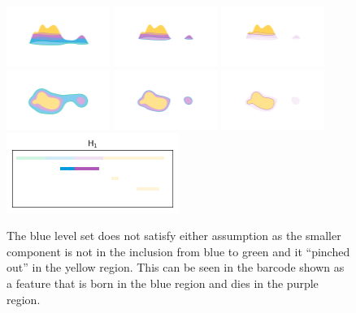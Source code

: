\begin{figure}[htbp]\label{fig:assumption1}
  \centering
  \includegraphics[trim=200 300 200 200, clip, width=0.3\textwidth]{scripts/figures/surf/ass2_B_side.png}
  \includegraphics[trim=200 300 200 200, clip, width=0.3\textwidth]{scripts/figures/surf/ass1_C_side.png}
  \includegraphics[trim=200 300 200 200, clip, width=0.3\textwidth]{scripts/figures/surf/ass1_D_side.png}
  \includegraphics[trim=300 100 200 200, clip, width=0.3\textwidth]{scripts/figures/surf/ass2_B_top.png}
  \includegraphics[trim=300 150 300 200, clip, width=0.3\textwidth]{scripts/figures/surf/ass1_C_top.png}
  \includegraphics[trim=300 150 300 200, clip, width=0.3\textwidth]{scripts/figures/surf/ass1_D_top.png}
  \includegraphics[width=0.5\textwidth]{scripts/figures/scalar_barcode_H1-masked.png}
  \caption{The blue level set does not satisfy either assumption as the smaller component is not in the inclusion from blue to green and it ``pinched out'' in the yellow region. This can be seen in the barcode shown as a feature that is born in the blue region and dies in the purple region.}
\end{figure}


